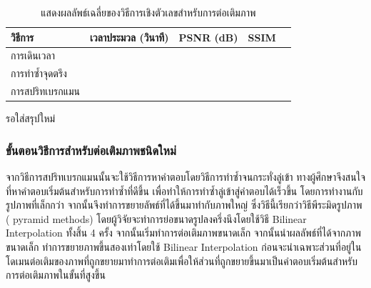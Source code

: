 \documentclass[hidelinks, a4paper,12pt]{article}
\numberwithin{equation}{section}							%
\numberwithin{equation}{section}
\begin{document}
{	\begin{table}[H]
		\centering
		\begin{tabular}[ht]{|l|c|c|c|c|}
			\hline
			วิธีการ  & เวลาประมวล  (วินาที) & PSNR (dB) & SSIM \\
			\hline
			การเดินเวลา &  & & \\
			การทำซ้ำจุดตรึง & & & \\
			การสปริทเบรกแมน & & &  \\
			\hline
		\end{tabular}
		\caption{แสดงผลลัพธ์เฉลี่ยของวิธีการเชิงตัวเลขสำหรับการต่อเติมภาพ}
	\end{table}	
	\hspace{1cm} 
	รอใส่สรุปใหม่
	
	\subsubsection{ขั้นตอนวิธีการสำหรับต่อเติมภาพชนิดใหม่}
	\hspace{1cm} จากวิธีการสปริทเบรกแมนนั้นจะใช้วิธีการหาคำตอบโดยวิธีการทำซ้ำจนกระทั่งลู่เข้า ทางผู้ศึกษาจึงสนใจที่หาคำตอบเริ่มต้นสำหรับการทำซ้ำที่ดีขึ้น เพื่อทำให้การทำซ้ำลู่เข้าสู่คำตอบได้เร็วขึ้น โดยการทำงานกับรูปภาพที่เล็กกว่า จากนั้นจึงทำการขยายลัพธ์ที่ได้ขึ้นมาทำกับภาพใหญ่ ซึ่งวิธีนี้เรียกว่าวิธีพีระมิดรูปภาพ ( pyramid methods) \cite{ref:image-pyramid}  โดยผู้วิจัยจะทำการย่อขนาดรูปลงครึ่งนึงโดยใช้วิธี Bilinear Interpolation ทั้งสิ้น 4 ครั้ง จากนั้นเริ่มทำการต่อเติมภาพขนาดเล็ก จากนั้นนำผลลัพธ์ที่ได้จากภาพขนาดเล็ก ทำการขยายภาพขึ้นสองเท่าโดยใช้ Bilinear Interpolation
	 ก่อนจะนำเฉพาะส่วนที่อยู่ในโดเมนต่อเติมของภาพที่ถูกขยายมาทำการต่อเติมเพื่อให้ส่วนที่ถูกขยายขึ้นมาเป็นคำตอบเริ่มต้นสำหรับการต่อเติมภาพในขั้นที่สูงขึ้น
	 
}
\end{document}
